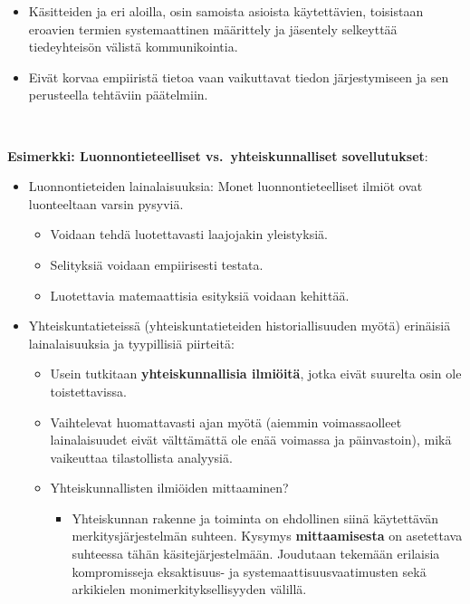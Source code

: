 \documentclass[
]{book}
\providecommand{\tightlist}{%
  \setlength{\itemsep}{0pt}\setlength{\parskip}{0pt}}
\begin{document}
\begin{itemize}
\begin{itemize}
    \begin{itemize}
    \tightlist
    \item
      Käsitteiden ja eri aloilla, osin samoista asioista käytettävien, toisistaan eroavien termien systemaattinen määrittely ja jäsentely selkeyttää tiedeyhteisön välistä kommunikointia.\\
    \item
      Eivät korvaa empiiristä tietoa vaan vaikuttavat tiedon järjestymiseen ja sen perusteella tehtäviin päätelmiin.\\
      \strut \\
    \end{itemize}
  \end{itemize}
\end{itemize}

\begin{eblock}{}

\textbf{Esimerkki: Luonnontieteelliset vs.~yhteiskunnalliset sovellutukset}:

\begin{itemize}
\tightlist
\item
  Luonnontieteiden lainalaisuuksia: Monet luonnontieteelliset ilmiöt ovat luonteeltaan varsin pysyviä.

  \begin{itemize}
  \tightlist
  \item
    Voidaan tehdä luotettavasti laajojakin yleistyksiä.
  \item
    Selityksiä voidaan empiirisesti testata.
  \item
    Luotettavia matemaattisia esityksiä voidaan kehittää.
  \end{itemize}
\item
  Yhteiskuntatieteissä (yhteiskuntatieteiden historiallisuuden myötä) erinäisiä lainalaisuuksia ja tyypillisiä piirteitä:

  \begin{itemize}
  \tightlist
  \item
    Usein tutkitaan \textbf{yhteiskunnallisia ilmiöitä}, jotka eivät suurelta osin ole toistettavissa.
  \item
    Vaihtelevat huomattavasti ajan myötä (aiemmin voimassaolleet lainalaisuudet eivät välttämättä ole enää voimassa ja päinvastoin), mikä vaikeuttaa tilastollista analyysiä.
  \item
    Yhteiskunnallisten ilmiöiden mittaaminen?

    \begin{itemize}
    \tightlist
    \item
      Yhteiskunnan rakenne ja toiminta on ehdollinen siinä käytettävän merkitysjärjestelmän suhteen. Kysymys \textbf{mittaamisesta} on asetettava suhteessa tähän käsitejärjestelmään. Joudutaan tekemään erilaisia kompromisseja eksaktisuus- ja systemaattisuusvaatimusten sekä arkikielen monimerkityksellisyyden välillä.
    \end{itemize}
  \end{itemize}
\end{itemize}

\end{eblock}
\end{document}
